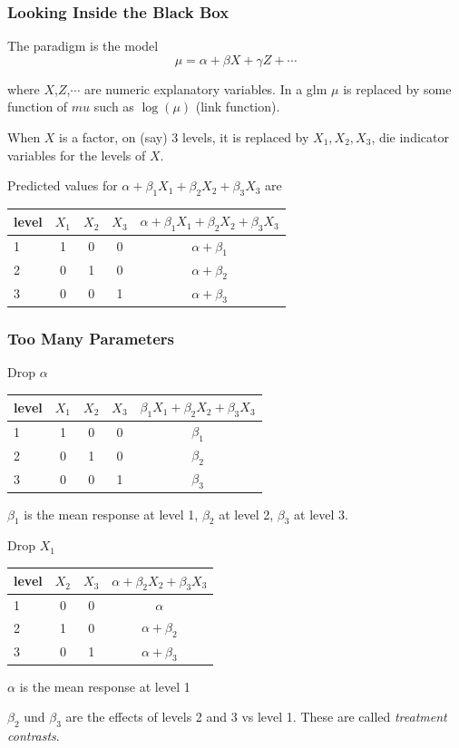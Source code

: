 \documentclass[xcolor={table}]{beamer}
\begin{document}
\begin{frame}\frametitle{Looking Inside the Black Box}
The paradigm is the model
$$\mu = \alpha + \beta X + \gamma Z + \cdots$$

where $X$,$Z$,$\cdots$ are numeric explanatory variables. In a glm $\mu$ is replaced by some function of $mu$ such as $\log(\mu)$ (link function). 

When $X$ is a factor, on (say) 3 levels, it is replaced by $X_1,X_2,X_3$, die indicator variables for the levels of $X$.

Predicted values for $\alpha+\beta_1X_1+\beta_2X_2+\beta_3X_3 $ are

\vspace*{0.5cm}

\begin{center}
\begin{tabular}{l c c c c}
level&$X_1$&$X_2$&$X_3$&$\alpha+\beta_1X_1+\beta_2X_2+\beta_3X_3 $\\
\hline
1&1&0&0&$\alpha+\beta_1$\\
2&0&1&0&$\alpha+\beta_2$\\
3&0&0&1&$\alpha+\beta_3$\\
\end{tabular}
\end{center}

\end{frame}



\begin{frame}[shrink=2]\frametitle{Too Many Parameters}
Drop $\alpha$

\begin{center}
\begin{tabular}{l c c c c}
level&$X_1$&$X_2$&$X_3$&$\beta_1X_1+\beta_2X_2+\beta_3X_3 $\\
\hline
1&1&0&0&$\beta_1$\\
2&0&1&0&$\beta_2$\\
3&0&0&1&$\beta_3$\\
\end{tabular}
\end{center}

$\beta_1$ is the mean response at level 1, $\beta_2$ at level 2, $\beta_3$ at level 3.

Drop $X_1$

\begin{center}
\begin{tabular}{l c c c}
level&$X_2$&$X_3$&$\alpha+\beta_2X_2+\beta_3X_3 $\\
\hline
1&0&0&$\alpha$\\
2&1&0&$\alpha+\beta_2$\\
3&0&1&$\alpha+\beta_3$\\
\end{tabular}
\end{center}

$\alpha$ is the mean response at level 1

$\beta_2$ und $\beta_3$ are the effects of levels 2 and 3 vs level 1. These are called \emph{treatment contrasts}.

\end{frame}
\end{document}
